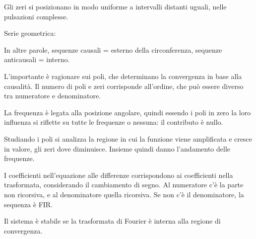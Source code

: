 Gli zeri si posizionano in modo uniforme a intervalli distanti uguali, nelle pulsazioni complesse. 

Serie geometrica:

In altre parole, sequenze causali = esterno della circonferenza, sequenze anticausali = interno.

L'importante è ragionare sui poli, che determinano la convergenza in base alla causalità. Il numero di poli e zeri corrisponde all'ordine, che può essere diverso tra numeratore e denominatore.

La frequenza è legata alla posizione angolare, quindi essendo i poli in zero la loro influenza si riflette su tutte le frequenze o nessuna: il contributo è nullo.

Studiando i poli si analizza la regione in cui la funzione viene amplificata e cresce in valore, gli zeri dove diminuisce. Insieme quindi danno l'andamento delle frequenze.

I coefficienti nell'equazione alle differenze corrispondono ai coefficienti nella trasformata, considerando il cambiamento di segno. Al numeratore c'è la parte non ricorsiva, e al denominatore quella ricorsiva. Se non c'è il denominatore, la sequenza è FIR.

Il sistema è stabile se la trasformata di Fourier è interna alla regione di convergenza. 




